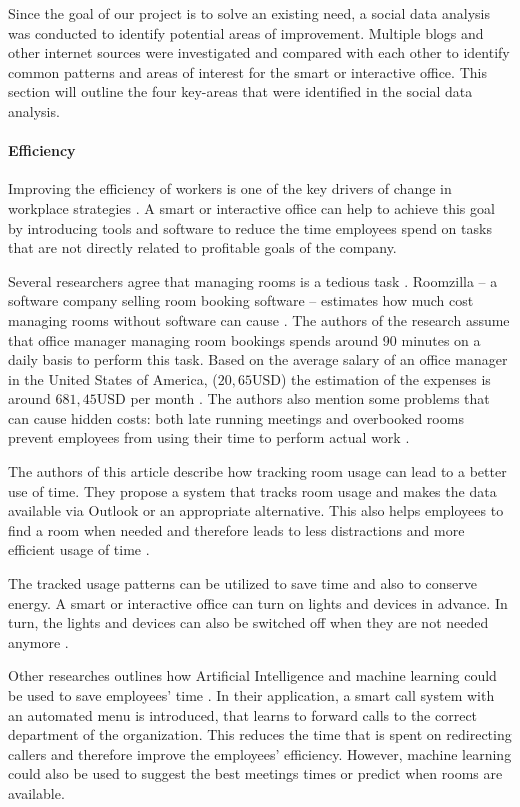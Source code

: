 Since the goal of our project is to solve an existing need, a social data analysis was conducted to 
identify potential areas of improvement. Multiple blogs and other internet sources were investigated 
and compared with each other to identify common patterns and areas of interest for the smart or 
interactive office. This section will outline the four key-areas that were identified in the social 
data analysis.

\paragraph{Efficiency}\label{sec:sda-efficiency}
Improving the efficiency of workers is one of the key drivers of change in workplace strategies 
 \cite{hub13}. A smart or interactive office can help to achieve this goal by introducing tools and software to reduce the time employees spend on tasks that are not directly related to profitable 
goals of the company.

Several researchers agree that managing rooms is a tedious task \cite{iotagenda} \cite{roomzilla9}. 
Roomzilla -- a software company selling room booking software -- estimates how 
much cost managing rooms without software can cause \cite{roomzilla9}. The authors of the research assume that office manager managing room bookings spends around 90 minutes on a daily basis to perform this task. Based on the average salary of an office 
manager in the United States of America, (\(20,65\text{USD}\)) the estimation of the expenses is around \(681,45\text{USD}\) 
per month \cite{roomzilla9}. The authors also mention some problems that can cause hidden costs: both late running 
meetings and overbooked rooms prevent employees from using their time to perform actual work \cite{roomzilla9}. 

The authors of this article describe how tracking room usage can lead to a better use of 
time. They propose a system that tracks room usage and makes the data available via Outlook or an 
appropriate alternative. This also helps employees to find a room when needed and therefore leads to 
less distractions and more efficient usage of time \cite{iotagenda}.

The tracked usage patterns can be utilized to save time and also to conserve energy. A smart or 
interactive office can turn on lights and devices in advance. In turn, the lights and devices can 
also be switched off when they are not needed anymore \cite{hbcommunications}.

Other researches outlines how Artificial Intelligence and machine learning could be used to save employees' 
time \cite{hbcommunications}. In their application, a smart call system with an automated menu is introduced, that learns to forward calls 
to the correct department of the organization. This reduces the time that is spent on redirecting callers and 
therefore improve the employees' efficiency. However, machine learning could also be used to suggest 
the best meetings times or predict when rooms are available.

